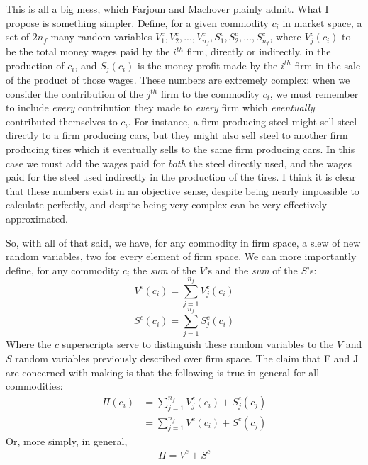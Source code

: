 This is all a big mess, which Farjoun and Machover plainly admit. What I propose is something simpler. Define, for a given commodity $c_i$ in market space, a set of $2n_f$ many random variables $V_1^c, V_2^c,...,V_{n_f}^c,S_1^c,S_2^c,...,S_{n_f}^c$, where $V_j^c(c_i)$ to be the total money wages paid by the $i^{th}$ firm, directly or indirectly, in the production of $c_i$, and $S_j(c_i)$ is the money profit made by the $i^{th}$ firm in the sale of the product of those wages. These numbers are extremely complex: when we consider the contribution of the $j^{th}$ firm to the commodity $c_i$, we must remember to include \textit{every} contribution they made to \textit{every} firm which \textit{eventually} contributed themselves to $c_i$. For instance, a firm producing steel might sell steel directly to a firm producing cars, but they might also sell steel to another firm producing tires which it eventually sells to the same firm producing cars. In this case we must add the wages paid for \textit{both} the steel directly used, and the wages paid for the steel used indirectly in the production of the tires. I think it is clear that these numbers exist in an objective sense, despite being nearly impossible to calculate perfectly, and despite being very complex can be very effectively approximated. \par 
So, with all of that said, we have, for any commodity in firm space, a slew of new random variables, two for every element of firm space. We can more importantly define, for any commodity $c_i$ the \textit{sum} of the $V$'s and the \textit{sum} of the $S$'s:
\[ V^c(c_i) = \sum_{j=1}^{n_f} V_j^c(c_i) \]
\[ S^c(c_i) = \sum_{j=1}^{n_f} S_j^c(c_i) \]
Where the $c$ superscripts serve to distinguish these random variables to the $V$ and $S$ random variables previously described over firm space. The claim that F and J are concerned with making is that the following is true in general for all commodities:
\begin{align}
	\Pi(c_i) &= \sum_{j=1}^{n_f} V^c_j(c_i) + S^c_j(c_j) \\
			&= \sum_{j=1}^{n_f} V^c(c_i)+S^c(c_j)
\end{align}
Or, more simply, in general, 
\begin{align}
	\Pi = V^c + S^c
\end{align}
